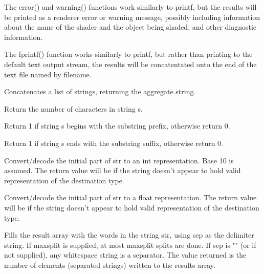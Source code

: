\documentclass[11pt,letterpaper]{book}
\begin{document}
 
The {\cf error()} and {\cf warning()} functions work similarly to {\cf printf}, but the
results will be printed as a renderer error or warning message, possibly including
information about the name of the shader and the object being shaded,
and other diagnostic information.
\apiend

The {\cf fprintf()} function works similarly to {\cf printf}, but rather
than printing to the default text output stream, the results will be
concatentated onto the end of the text file named by {\cf filename}.
\apiend

Concatenates a list of strings, returning the aggregate string.
\apiend

Return the number of characters in string {\ce s}.
\apiend

Return 1 if string {\cf s} begins with the substring {\cf prefix},
otherwise return 0.
\apiend

Return 1 if string {\cf s} ends with the substring {\cf suffix},
otherwise return 0.
\apiend

Convert/decode the initial part of {\cf str} to an {\cf int} 
representation.  Base 10 is assumed.
The return value will be {} if the string doesn't appear to hold
valid representation of the destination type.
\apiend

Convert/decode the initial part of {\cf str} to a {\cf float} representation.
The return value will be {} if the string doesn't appear to hold
valid representation of the destination type.
\apiend


Fills the {\cf result} array with the words in the string {\cf str},
using {\cf sep} as the delimiter string.  If {\cf maxsplit} is supplied,
at most {\cf maxsplit} splits are done.  If {\cf sep} is {\cf ""} (or if
not supplied), any whitespace string is a separator.  The value returned
is the number of elements (separated strings) written to the {\cf results}
array.
\apiend
\end{document}

